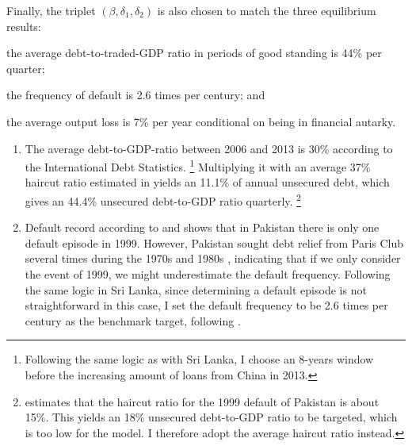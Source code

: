 Finally, the triplet $\left( \beta, \delta_1, \delta_2 \right)$ is also chosen to match the three equilibrium results:
\begin{enumerate*}[label = (\roman*)]
    \item the average debt-to-traded-GDP ratio in periods of good standing is 44\% per quarter;
    \item the frequency of default is 2.6 times per century; and
    \item the average output loss is 7\% per year conditional on being in financial autarky.
\end{enumerate*}
\begin{enumerate}[label = (\roman*)]
    \item
    The average debt-to-GDP-ratio between 2006 and 2013 is 30\% according to the International Debt Statistics.%
    \footnote{
        Following the same logic as with Sri Lanka, I choose an 8-years window before the increasing amount of loans from China in 2013.
        }
    Multiplying it with an average 37\% haircut ratio estimated in \citet{Cruces-Trebesch-13} yields an 11.1\% of annual unsecured debt, which gives an 44.4\% unsecured debt-to-GDP ratio quarterly.%
    \footnote{
        \citet{Cruces-Trebesch-13} estimates that the haircut ratio for the 1999 default of Pakistan is about 15\%. This yields an 18\% unsecured debt-to-GDP ratio to be targeted, which is too low for the model. I therefore adopt the average haircut ratio instead.
        }
    \item Default record according to \citet{SPGlobal-default-report} and \citet{Uribe-Schmitt-Grohe-textbook} shows that in Pakistan there is only one default episode in 1999. However, Pakistan sought debt relief from Paris Club several times during the 1970s and 1980s \citep{pakistan-default-start}, indicating that if we only consider the event of 1999, we might underestimate the default frequency.\footnotemark{} Following the same logic in Sri Lanka, since determining a default episode is not straightforward in this case, I set the default frequency to be 2.6 times per century as the benchmark target, following \citet{Na-18}.
\end{enumerate}
